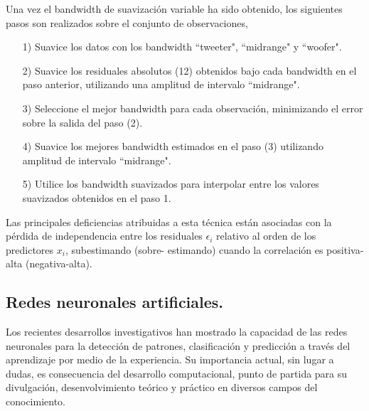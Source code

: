 \hspace*{0.4 cm} Una vez el bandwidth de suavizaci\'on variable ha sido obtenido, los siguientes pasos son realizados sobre el conjunto de observaciones,

\begin{itemize}
  \item[1)] Suavice los datos con los bandwidth ``tweeter"\hspace*{0.01 cm}, ``midrange"\hspace*{0.01 cm} y ``woofer"\hspace*{0.01 cm}.
  \item[2)] Suavice los residuales absolutos (12) obtenidos bajo cada bandwidth en el paso anterior, utilizando una amplitud de intervalo ``midrange"\hspace*{0.01 cm}.
  \item[3)] Seleccione el mejor bandwidth para cada observaci\'on, minimizando el error sobre la salida del paso (2).
  \item[4)] Suavice los mejores bandwidth estimados en el paso (3) utilizando amplitud de intervalo ``midrange"\hspace*{0.01 cm}.
  \item[5)] Utilice los bandwidth suavizados para interpolar entre los valores suavizados obtenidos en el paso 1.
\end{itemize}


\hspace*{0.4 cm} Las principales deficiencias atribuidas a esta t\'ecnica est\'an asociadas con la p\'erdida de independencia entre los residuales $\epsilon_{i}$ relativo al orden de los predictores $x_{i}$, subestimando (sobre- estimando) cuando la correlaci\'on es positiva-alta (negativa-alta).

\subsection{Redes neuronales artificiales.\\}


\hspace*{0.4 cm} Los recientes desarrollos investigativos han mostrado la capacidad de las redes neuronales para la detecci\'on de patrones, clasificaci\'on y predicci\'on a trav\'es del aprendizaje por medio de la experiencia. Su importancia actual, sin lugar a dudas, es consecuencia del desarrollo computacional, punto de partida para su divulgaci\'on, desenvolvimiento te\'orico y pr\'actico en diversos campos del conocimiento.

